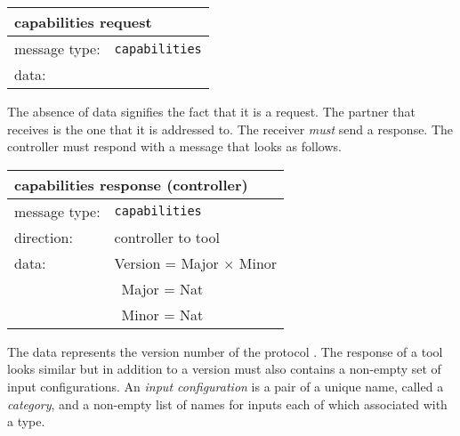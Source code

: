\documentclass{article}
\newcommand{\msg}[1]{\texttt{#1}}
\begin{document}
   \begin{table}[H]
    \begin{center}
     \begin{tabular}{|ll|}
      \hline
       \multicolumn{2}{|l|}{\textbf{capabilities request}} \\
      \hline
       message type:    & \msg{capabilities} \\
      \hline
       data:            & \\
      \hline
     \end{tabular}
     \vspace{-0.3cm}
    \end{center}
   \end{table}

   \noindent The absence of data signifies the fact that it is a request. The
   partner that receives is the one that it is addressed to. The receiver
   \emph{must} send a response. The controller must respond with a message that
   looks as follows.

   \begin{table}[H]
    \begin{center}
     \begin{tabular}{|ll|}
      \hline
       \multicolumn{2}{|l|}{\textbf{capabilities response (controller)}} \\
      \hline
       message type:   & \msg{capabilities} \\
      \hline
       direction:      & controller to tool \\
       data:           & Version = Major $\times$ Minor \\
                       & \ Major = Nat \\
                       & \ Minor = Nat \\
      \hline
     \end{tabular}
    \end{center}
    \vspace{-0.3cm}
   \end{table}

   \noindent The data represents the version number of the protocol . The
   response of a tool looks similar but in addition to a version must also
   contains a non-empty set of input configurations. An \textit{input
   configuration} is a pair of a unique name, called a \textit{category}, and a
   non-empty list of names for inputs each of which associated with a type.
   
\end{document}
